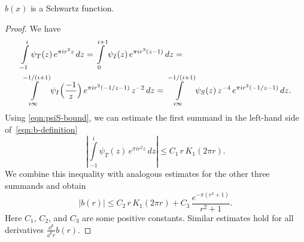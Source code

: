 \begin{proposition}\label{prop:b-schwartz}\leanok
$b(x)$ is a Schwartz function.
\end{proposition}
\begin{proof}
We have
\begin{align}
    &\int\limits_{-1}^{i}\psi_T(z)\,e^{\pi i r^2 z}\,dz=\int\limits_{0}^{i+1}\psi_I(z)\,e^{\pi i r^2 (z-1)}\,dz=\notag\\
    &\int\limits_{i\infty}^{-1/(i+1)}\psi_I\Big(\frac{-1}{z}\Big)\,e^{\pi i r^2 (-1/z-1)}\,z^{-2}\,dz=\int\limits_{i\infty}^{-1/(i+1)}\psi_S(z)\,z^{-4}\,e^{\pi i r^2 (-1/z-1)}\,dz.\notag
\end{align}
Using \eqref{eqn:psiS-bound}, we can estimate the first summand in the left-hand side of~\eqref{eqn:b-definition}
\begin{equation}
    \left|\int\limits_{-1}^i \psi_T(z)\,e^{\pi i r^2 z}\,dz \right|\leq C_1\,r\,K_1(2\pi r).
\end{equation}
We combine this inequality with analogous estimates for the other three summands and obtain
\begin{equation}
    |b(r)|\leq C_2\,r\,K_1(2\pi r)+C_3\,\frac{e^{-\pi(r^2+1)}}{r^2+1}.
\end{equation}
Here $C_1$, $C_2$, and $C_3$ are some positive constants. Similar estimates hold for all derivatives $\frac{\dd^k}{\dd^k r} b(r)$.
\end{proof}

